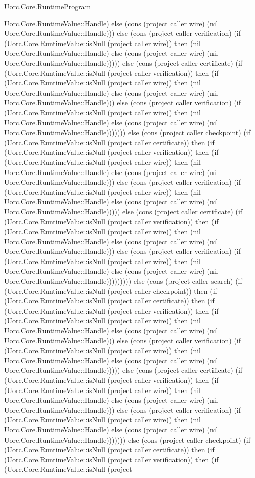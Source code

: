 \begin{lexlean}{Uorc.Core.RuntimeProgram}
\begin{semanticmodule}
{Uorc.Core.RuntimeValue::Handle) else (cons (project caller wire) (nil Uorc.Core.RuntimeValue::Handle))) else (cons (project caller verification) (if (Uorc.Core.RuntimeValue::isNull (project caller wire)) then (nil Uorc.Core.RuntimeValue::Handle) else (cons (project caller wire) (nil Uorc.Core.RuntimeValue::Handle))))) else (cons (project caller certificate) (if (Uorc.Core.RuntimeValue::isNull (project caller verification)) then (if (Uorc.Core.RuntimeValue::isNull (project caller wire)) then (nil Uorc.Core.RuntimeValue::Handle) else (cons (project caller wire) (nil Uorc.Core.RuntimeValue::Handle))) else (cons (project caller verification) (if (Uorc.Core.RuntimeValue::isNull (project caller wire)) then (nil Uorc.Core.RuntimeValue::Handle) else (cons (project caller wire) (nil Uorc.Core.RuntimeValue::Handle))))))) else (cons (project caller checkpoint) (if (Uorc.Core.RuntimeValue::isNull (project caller certificate)) then (if (Uorc.Core.RuntimeValue::isNull (project caller verification)) then (if (Uorc.Core.RuntimeValue::isNull (project caller wire)) then (nil Uorc.Core.RuntimeValue::Handle) else (cons (project caller wire) (nil Uorc.Core.RuntimeValue::Handle))) else (cons (project caller verification) (if (Uorc.Core.RuntimeValue::isNull (project caller wire)) then (nil Uorc.Core.RuntimeValue::Handle) else (cons (project caller wire) (nil Uorc.Core.RuntimeValue::Handle))))) else (cons (project caller certificate) (if (Uorc.Core.RuntimeValue::isNull (project caller verification)) then (if (Uorc.Core.RuntimeValue::isNull (project caller wire)) then (nil Uorc.Core.RuntimeValue::Handle) else (cons (project caller wire) (nil Uorc.Core.RuntimeValue::Handle))) else (cons (project caller verification) (if (Uorc.Core.RuntimeValue::isNull (project caller wire)) then (nil Uorc.Core.RuntimeValue::Handle) else (cons (project caller wire) (nil Uorc.Core.RuntimeValue::Handle))))))))) else (cons (project caller search) (if (Uorc.Core.RuntimeValue::isNull (project caller checkpoint)) then (if (Uorc.Core.RuntimeValue::isNull (project caller certificate)) then (if (Uorc.Core.RuntimeValue::isNull (project caller verification)) then (if (Uorc.Core.RuntimeValue::isNull (project caller wire)) then (nil Uorc.Core.RuntimeValue::Handle) else (cons (project caller wire) (nil Uorc.Core.RuntimeValue::Handle))) else (cons (project caller verification) (if (Uorc.Core.RuntimeValue::isNull (project caller wire)) then (nil Uorc.Core.RuntimeValue::Handle) else (cons (project caller wire) (nil Uorc.Core.RuntimeValue::Handle))))) else (cons (project caller certificate) (if (Uorc.Core.RuntimeValue::isNull (project caller verification)) then (if (Uorc.Core.RuntimeValue::isNull (project caller wire)) then (nil Uorc.Core.RuntimeValue::Handle) else (cons (project caller wire) (nil Uorc.Core.RuntimeValue::Handle))) else (cons (project caller verification) (if (Uorc.Core.RuntimeValue::isNull (project caller wire)) then (nil Uorc.Core.RuntimeValue::Handle) else (cons (project caller wire) (nil Uorc.Core.RuntimeValue::Handle))))))) else (cons (project caller checkpoint) (if (Uorc.Core.RuntimeValue::isNull (project caller certificate)) then (if (Uorc.Core.RuntimeValue::isNull (project caller verification)) then (if (Uorc.Core.RuntimeValue::isNull (project }
\end{semanticmodule}
\end{lexlean}
